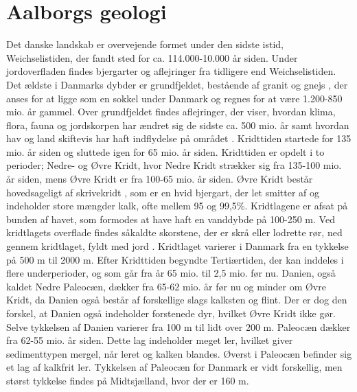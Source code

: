 \section{Aalborgs geologi}
Det danske landskab er overvejende formet under den sidste istid, Weichselistiden, der fandt sted for ca. 114.000-10.000 år siden. Under jordoverfladen findes bjergarter og aflejringer fra tidligere end Weichselistiden. Det ældste i Danmarks dybder er grundfjeldet, bestående af granit og gnejs \citep{geopdf}, der anses for at ligge som en sokkel under Danmark og regnes for at være 1.200-850 mio. år gammel. Over grundfjeldet findes aflejringer, der viser, hvordan klima, flora, fauna og jordskorpen har ændret sig de sidste ca. 500 mio. år samt hvordan hav og land skiftevis har haft indflydelse på området \citep{geolink}.
\newline
\newline
Kridttiden startede for 135 mio. år siden og sluttede igen for 65 mio. år siden. Kridttiden er opdelt i to perioder; Nedre- og Øvre Kridt, hvor Nedre Kridt strækker sig fra 135-100 mio. år siden, mens Øvre Kridt er fra 100-65 mio. år siden.  Øvre Kridt består hovedsageligt af skrivekridt \citep{geopdf}, som er en hvid bjergart, der let smitter af og indeholder store mængder kalk, ofte mellem 95 og 99,5\%. Kridtlagene er afsat på bunden af havet, som formodes at have haft en vanddybde på 100-250 m. Ved kridtlagets overflade findes såkaldte skorstene, der er skrå eller lodrette rør, ned gennem kridtlaget, fyldt med jord \citep[ s. 12-?]{geobog}. Kridtlaget varierer i Danmark fra en tykkelse på 500 m til 2000 m.
\newline
\newline
Efter Kridttiden begyndte Tertiærtiden, der kan inddeles i flere underperioder, og som går fra år 65 mio. til 2,5 mio. før nu.
\newline \indent{     }  Danien, også kaldet Nedre Paleocæn, dækker fra 65-62 mio. år før nu og minder om Øvre Kridt, da Danien også består af forskellige slags kalksten og flint. Der er dog den forskel, at Danien også indeholder forstenede dyr, hvilket Øvre Kridt ikke gør. Selve tykkelsen af Danien varierer fra 100 m til lidt over 200 m.
\newline \indent{     }  Paleocæn dækker fra 62-55 mio. år siden. Dette lag indeholder meget ler, hvilket giver sedimenttypen mergel, når leret og kalken blandes. Øverst i Paleocæn befinder sig et lag af kalkfrit ler. Tykkelsen af Paleocæn for Danmark er vidt forskellig, men størst tykkelse findes på Midtsjælland, hvor der er 160 m.
